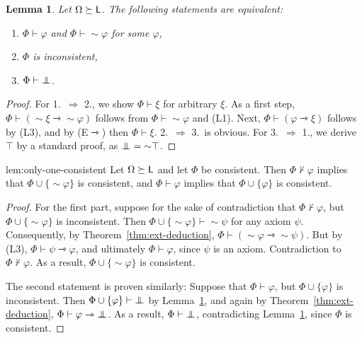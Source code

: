 \documentclass[a4paper,english,fleqn,11pt,final]{scrartcl}
\newcommand{\negg}{{\sim}}
\newcommand{\sfL}{\protect\ensuremath{\mathsf{L}}}
\newcommand{\timp}{\rightarrowtriangle}
\newcommand{\Deriv}[1]{{\normalfont\textsf{#1}}}
\newcommand{\falsum}{\mathrlap{\,\bot}\bot\,}
\theoremstyle{plain}
\newtheorem{lemma}[theorem]{Lemma}
\theoremstyle{definition}
\begin{document}
\begin{lemma}\label{lem:derive-contradiction}
Let $\Omega \succeq \sfL$. The following statements are equivalent:
\begin{enumerate}
	\item $\Phi \vdash \varphi$ and $\Phi\vdash \negg\varphi$ for some $\varphi$,
	\item $\Phi$ is inconsistent,
	\item $\Phi\vdash \falsum$.
\end{enumerate}
\end{lemma}
\begin{proof}
For 1.\ $\Rightarrow$ 2., we show $\Phi \vdash \xi$ for arbitrary $\xi$.
As a first step, $\Phi \vdash (\negg\xi \timp \negg\varphi)$ follows from $\Phi \vdash\negg\varphi$ and \Deriv{(L1)}.
Next, $\Phi \vdash (\varphi \timp \xi)$ follows by \Deriv{(L3)}, and by  \Deriv{(E$\timp$)} then $\Phi \vdash \xi$.
2.\ $\Rightarrow$ 3.\ is obvious.
For 3.\ $\Rightarrow$ 1., we derive $\top$ by a standard proof, as $\falsum = \negg\top$.
\end{proof}

\begin{replemma}{lem:only-one-consistent}
Let $\Omega \succeq \sfL$ and let $\Phi$ be consistent.
Then $\Phi \nvdash \varphi$ implies that $\Phi \cup \{ \negg \varphi \}$ is consistent, and $\Phi \vdash \varphi$ implies that $\Phi \cup \{\varphi\}$ is consistent.
\end{replemma}
\begin{proof}
For the first part, suppose for the sake of contradiction that $\Phi\nvdash \varphi$, but $\Phi \cup \{ \negg \varphi \}$ is inconsistent.
Then $\Phi \cup \{\negg\varphi\} \vdash \negg\psi$ for any axiom $\psi$.
Consequently, by Theorem~\ref{thm:ext-deduction}, $\Phi \vdash (\negg \varphi \timp \negg\psi)$.
But by \Deriv{(L3)}, $\Phi \vdash \psi \timp \varphi$, and ultimately $\Phi \vdash \varphi$, since $\psi$ is an axiom.
Contradiction to $\Phi\nvdash \varphi$.
As a result, $\Phi \cup \{ \negg \varphi \}$ is consistent.

The second statement is proven similarly:
Suppose that $\Phi \vdash \varphi$, but $\Phi\cup\{\varphi\}$ is inconsistent.
Then $\Phi\cup\{\varphi\} \vdash \falsum$ by Lemma~\ref{lem:derive-contradiction}, and again by Theorem~\ref{thm:ext-deduction}, $\Phi \vdash \varphi \timp \falsum$.
As a result, $\Phi \vdash \falsum$, contradicting Lemma~\ref{lem:derive-contradiction}, since $\Phi$ is consistent.
\end{proof}
\end{document}
